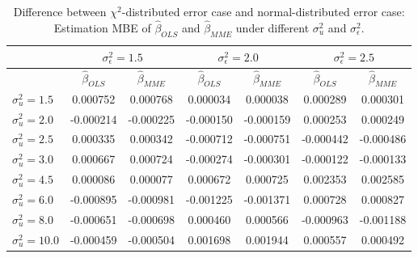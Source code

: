 \documentclass{article}
\begin{document}
\begin{table}[ht]
    \centering
    \caption{Difference between $\chi^2$-distributed error case and normal-distributed error case: Estimation MBE of $\hat{\beta}_{OLS}$ and $\hat{\beta}_{MME}$ under different $\sigma^2_u$ and $\sigma^2_\epsilon$.}
    \label{Tab:MBE_diff_chi_normal}
    \begin{tabular}[t]{lcccccc}
        \hline
        &\multicolumn{2}{c}{$\sigma^2_\epsilon=1.5$}&\multicolumn{2}{c}{$\sigma^2_\epsilon=2.0$}&\multicolumn{2}{c}{$\sigma^2_\epsilon=2.5$}\\
        \hline
        &$\hat{\beta}_{OLS}$&$\hat{\beta}_{MME}$&$\hat{\beta}_{OLS}$&$\hat{\beta}_{MME}$&$\hat{\beta}_{OLS}$&$\hat{\beta}_{MME}$\\
        \hline
        $\sigma^2_u = 1.5$&0.000752&0.000768&0.000034&0.000038&0.000289&0.000301\\
        $\sigma^2_u = 2.0$&-0.000214&-0.000225&-0.000150&-0.000159&0.000253&0.000249\\
        $\sigma^2_u = 2.5$&0.000335&0.000342&-0.000712&-0.000751&-0.000442&-0.000486\\
        $\sigma^2_u = 3.0$&0.000667&0.000724&-0.000274&-0.000301&-0.000122&-0.000133\\
        $\sigma^2_u = 4.5$&0.000086&0.000077&0.000672&0.000725&0.002353&0.002585\\
        $\sigma^2_u = 6.0$&-0.000895&-0.000981&-0.001225&-0.001371&0.000728&0.000827\\
        $\sigma^2_u = 8.0$&-0.000651&-0.000698&0.000460&0.000566&-0.000963&-0.001188\\
        $\sigma^2_u = 10.0$&-0.000459&-0.000504&0.001698&0.001944&0.000557&0.000492\\
    \end{tabular}
\end{table}
\end{document}
